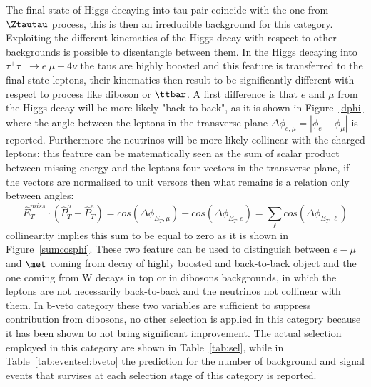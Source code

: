 The final state of Higgs decaying into tau pair coincide with the one from  $\Ztautau$  process, this is then an irreducible 
background for this category. Exploiting the different kinematics of the Higgs decay with respect to 
other backgrounds is possible to disentangle
between them. In the Higgs decaying into $\tau^{+} \tau^{-} \rightarrow e ~ \mu + 4\nu$ the taus are highly boosted
and this feature is transferred to the final state leptons, their kinematics then result to be  significantly different 
with respect to process like diboson or $\ttbar$. A first difference is that  $e$ and $\mu$ from the Higgs decay 
will be more likely "back-to-back",
as it is shown in Figure~\ref{dphi} where the angle between the leptons in the transverse plane 
$\Delta\phi_{e,\mu} = |\phi_{e} - \phi_{\mu}|$ 
is reported.  Furthermore the neutrinos will be more likely collinear with the charged leptons:
this feature can be matematically seen as the sum of scalar product between missing energy and the leptons four-vectors in the
transverse plane, if the vectors are normalised to unit versors then what remains is a relation only between angles:
$$ \hat{E}_{T}^{miss} \cdot ( \hat{P}_{T}^{\mu} + \hat{P}_{T}^{e} ) = cos(\Delta\phi_{E_{T},\mu}) 
+ cos(\Delta\phi_{E_{T},e}) = \sum_\ell cos(\Delta\phi_{E_{T},\ell}) $$
collinearity implies this sum to be equal to zero as it is shown in Figure~\ref{sumcosphi}. 
These two feature can be used to distinguish between $e-\mu$ and $\met$ coming from decay of highly 
boosted and back-to-back object and the one coming from W decays in top or in dibosons backgrounds,
in which the leptons are not necessarily back-to-back and the neutrinos not collinear with them.
In b-veto category these two variables are sufficient to suppress contribution from dibosons,
no other selection is applied in this category because it has been shown to not bring significant improvement.
The actual selection employed in this category are shown in Table~\ref{tab:sel}, while in Table~\ref{tab:eventsel:bveto}
the prediction for the number of background and signal events that survises at 
each selection stage of this category is reported.



